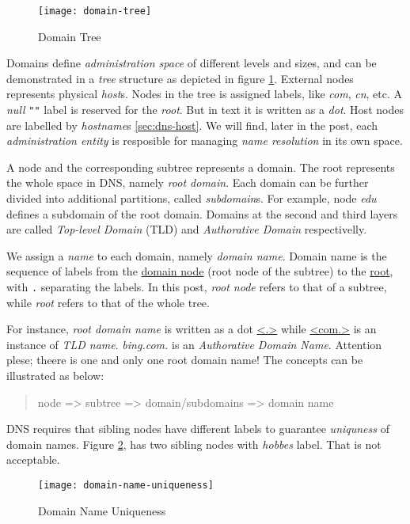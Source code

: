 \begin{figure}[tbp]
  \centering
  \texttt{[image: domain-tree]}
  \caption{Domain Tree}
  \label{fig:domain-tree}
\end{figure}

Domains define \textit{administration space} of different levels
and sizes, and can be demonstrated in a \textit{tree} structure as
depicted in figure \ref{fig:domain-tree}. External nodes
represents physical \textit{host}s. Nodes in the tree is assigned
labels, like \textit{com}, \textit{cn}, etc. A \textit{null}
\verb|""| label is reserved for the \textit{root}. But in text it
is written as a \textit{dot}. Host nodes are labelled by
\textit{hostname}s \ref{sec:dns-host}. We will find, later in the
post, each \textit{administration entity} is resposible for
managing \textit{name resolution} in its own space.

A node and the corresponding subtree represents a domain. The root
represents the whole space in DNS, namely \textit{root
  domain}. Each domain can be further divided into additional
partitions, called \textit{subdomain}s. For example, node
\textit{edu} defines a subdomain of the root domain. Domains at
the second and third layers are called \textit{Top-level Domain}
(TLD) and \textit{Authorative Domain} respectivelly.

We assign a \textit{name} to each domain, namely \textit{domain
  name}. Domain name is the sequence of labels from the
\uline{domain node} (root node of the subtree) to the
\uline{root}, with \verb|.| separating the labels. In this post,
\textit{root node} refers to that of a subtree, while
\textit{root} refers to that of the whole tree.

For instance, \textit{root domain name} is written as a dot
\uline{<.>} while \uline{<com.>} is an instance of \textit{TLD
  name}. \textit{bing.com.} is an \textit{Authorative Domain
  Name}. Attention plese; theere is one and only one root domain
name! The concepts can be illustrated as below:

\begin{quotation}
  node => subtree => domain/subdomains => domain name
\end{quotation}

DNS requires that sibling nodes have different labels to guarantee
\textit{uniquness} of domain names. Figure
\ref{fig:domain-name-uniqueness}, has two sibling nodes with
\textit{hobbes} label. That is not acceptable.

\begin{figure}
  \centering
  \texttt{[image: domain-name-uniqueness]}
  \caption{Domain Name Uniqueness}
  \label{fig:domain-name-uniqueness}
\end{figure}

